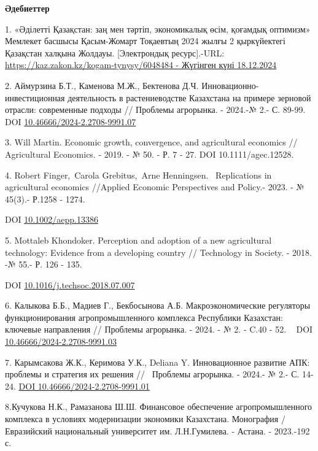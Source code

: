 \begin{center}
{\bfseries Әдебиеттер}
\end{center}

\begin{references}
1. «Әділетті Қазақстан: заң мен тәртіп, экономикалық өсім, қоғамдық
оптимизм» Мемлекет басшысы Қасым-Жомарт Тоқаевтың 2024 жылғы 2
қыркүйектегі Қазақстан халқына Жолдауы. {[}Электрондық ресурс{]}.-URL:
\href{https://kaz.zakon.kz/kogam-tynysy/6048484\%20-\%2018.12.2024}{https://kaz.zakon.kz/kogam-tynysy/6048484
- Жүгінген күні 18.12.2024}

2. Аймурзина Б.Т., Каменова М.Ж., Бектенова Д.Ч.
Инновационно-инвестиционная деятельность в растениеводстве Казахстана на
примере зерновой отрасли: современные подходы // Проблемы агрорынка. -
2024.-№ 2.- С. 89-99. DOI
\href{https://doi.org/10.46666/2024-2.2708-9991.07}{10.46666/2024-2.2708-9991.07}

3. Will Martin. Economic growth, convergence, and agricultural economics
// Agricultural Economics. - 2019. - № 50. - Р. 7 - 27. DOI
10.1111/agec.12528.

4. Robert Finger,~Carola Grebitus,~Arne Henningsen. ~Replications in
agricultural economics //Applied Economic Perspectives and Policy.-
2023. - № 45(3).- Р.1258 - 1274.

DOI \href{https://doi.org/10.1002/aepp.13386}{10.1002/aepp.13386}

5. Mottaleb Khondoker. Perception and adoption of a new agricultural
technology: Evidence from a developing country // Technology in Society.
- 2018. -№ 55.- Р. 126 - 135.

DOI
\href{http://dx.doi.org/10.1016/j.techsoc.2018.07.007}{10.1016/j.techsoc.2018.07.007}

6. Калыкова Б.Б., Мадиев Г., Бекбосынова А.Б. Макроэкономические
регуляторы функционирования агропромышленного комплекса Республики
Казахстан: ключевые направления // Проблемы агрорынка. - 2024. - № 2. -
C.40 - 52. ~ DOI
\href{https://doi.org/10.46666/2024-2.2708-9991.03}{10.46666/2024-2.2708-9991.03}

7. Карымсакова Ж.К., Керимова У.К., Deliana Y. Инновационное развитие
АПК: проблемы и стратегия их решения // ~Проблемы агрорынка. - 2024.- №
2.- С. 14-24. \href{https://doi.org/10.46666/2024-2.2708-9991.01}{DOI
10.46666/2024-2.2708-9991.01}

8.Кучукова Н.К., Рамазанова Ш.Ш. Финансовое обеспечение
агропромышленного комплекса в условиях модернизации экономики
Казахстана. Монография / Евразийский национальный университет им.
Л.Н.Гумилева. - Астана. - 2023.-192 с.


\end{references}
